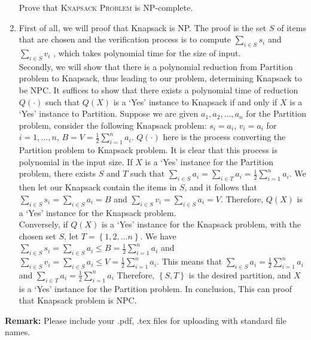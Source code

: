 \documentclass[12pt,a4paper]{article}
\makeatletter
\newtheorem*{solution}{Solution}
\theoremstyle{definition}
\renewenvironment{solution}[1][Solution] {\par\pushQED{\qed}\normalfont\topsep6\p@\@plus6\p@\relax\trivlist\item[\hskip\labelsep\bfseries#1\@addpunct{.}]\ignorespaces}{\popQED\endtrivlist\@endpefalse} \makeatother
\makeatother
\begin{document}
\begin{enumerate}
    Prove that \textsc{Knapsack Problem} is NP-complete.
    
    \begin{solution}
    First of all, we will proof that Knapsack is NP. The proof is the set $S$ of items that are chosen and the
    verification process is to compute $\sum_{i \in S} s_i $ and $\sum_{i \in S} v_i $
    , which takes polynomial time for the size of
    input.\\
Secondly, we will show that there is a polynomial reduction from Partition problem to Knapsack, thus leading to our problem, determining Knapsack to be NPC.
It suffices to show that there exists a polynomial time of reduction $Q\left(·\right)$ such that $Q\left(X\right)$ is a ‘Yes’
instance to Knapsack if and only if $X$ is a ‘Yes’ instance to Partition. Suppose we are given $a_1, a_2, . . . , a_n$ for
the Partition problem, consider the following Knapsack problem: $s_i = a_i$, $v_i = a_i$ for $i = 1, . . . , n$,
$B = V = \frac{1}{2} \sum_{i=1}^n a_i       $. $Q(·)$ here is the process converting the Partition problem to Knapsack
problem. It is clear that this process is polynomial in the input size.
If $X$ is a ‘Yes’ instance for the Partition problem, there exists $S$ and $T$ such that $\sum_{i \in S} a_i = \sum_{i \in T} a_i = \frac{1}{2} \sum_{i=1}^n a_i$. We then let our Knapsack contain the items in $S$, and it follows that  $\sum_{i \in S} s_i = \sum_{i \in S} a_i = B$ and  $\sum_{i \in S} v_i = \sum_{i \in S} a_i = V$. Therefore, $Q(X)$ is a ‘Yes’ instance for the Knapsack problem.\\
Conversely, if $Q(X)$ is a ‘Yes’ instance for the Knapsack problem, with the chosen set $S$, let $T=\left\{1,2, ...n\right\}$. We have $\sum_{i \in S} s_i = \sum_{i \in S} a_i \leq B = \frac{1}{2} \sum_{i=1}^n a_i$ and $\sum_{i \in S} v_i = \sum_{i \in S} a_i \leq V = \frac{1}{2} \sum_{i=1}^n a_i$. This means that $\sum_{i \in S} a_i = \frac{1}{2} \sum_{i=1}^n a_i$ and $\sum_{i \in T} a_i = \frac{1}{2} \sum_{i=1}^n a_i$
Therefore, $\left\{S, T\right\}$ is the desired partition, and $X$ is a ‘Yes’ instance for the Partition problem. In conclusion, This can proof that Knapsack problem is NPC.


    
    
    \end{solution}
    
    
\end{enumerate}


\textbf{Remark:} Please include your .pdf, .tex files for uploading with standard file names.
\newpage


\end{document}
